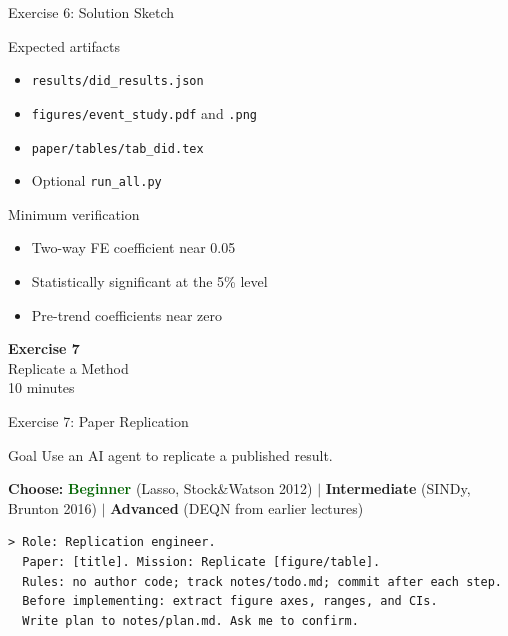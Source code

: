 \documentclass[aspectratio=169,10pt]{beamer}
\begin{document}
\begin{frame}{Exercise 6: Solution Sketch}
\small
\begin{exampleblock}{Expected artifacts}
\begin{itemize}\itemsep1pt
    \item \texttt{results/did\_results.json}
    \item \texttt{figures/event\_study.pdf} and \texttt{.png}
    \item \texttt{paper/tables/tab\_did.tex}
    \item Optional \texttt{run\_all.py}
\end{itemize}
\end{exampleblock}

\begin{alertblock}{Minimum verification}
\begin{itemize}\itemsep1pt
    \item Two-way FE coefficient near 0.05
    \item Statistically significant at the 5\% level
    \item Pre-trend coefficients near zero
\end{itemize}
\end{alertblock}
\end{frame}

\begin{frame}{}
\vfill\begin{center}{\Huge \textcolor{uzhblue}{\textbf{Exercise 7}}}\\[12pt]
{\LARGE Replicate a Method}\\[6pt]{\small 10 minutes}\end{center}\vfill
\end{frame}

\begin{frame}[fragile]{Exercise 7: Paper Replication}
\begin{exampleblock}{Goal}
Use an AI agent to replicate a published result.
\end{exampleblock}
\small
\textbf{Choose:} \textcolor{darkgreen}{\textbf{Beginner}} (Lasso, Stock\&Watson 2012) $|$
\textcolor{softorange}{\textbf{Intermediate}} (SINDy, Brunton 2016) $|$
\textcolor{harvardcrimson}{\textbf{Advanced}} (DEQN from earlier lectures)

\vspace{0.3em}
\begin{lstlisting}[style=prompt, basicstyle=\scriptsize\ttfamily]
> Role: Replication engineer.
  Paper: [title]. Mission: Replicate [figure/table].
  Rules: no author code; track notes/todo.md; commit after each step.
  Before implementing: extract figure axes, ranges, and CIs.
  Write plan to notes/plan.md. Ask me to confirm.
\end{lstlisting}
\end{frame}
\end{document}
